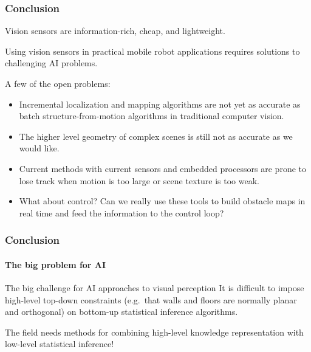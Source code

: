 \documentclass[aspectratio=169]{beamer}
\begin{document}
\begin{frame}
\frametitle{Conclusion}

Vision sensors are \alert{information-rich}, \alert{cheap}, and 
\alert{lightweight}.

\medskip

Using vision sensors in practical mobile robot applications requires
solutions to challenging AI problems.

\medskip

A few of the open problems:
\begin{itemize}
\item Incremental localization and mapping
  algorithms are not yet as accurate as
  batch structure-from-motion algorithms in traditional computer vision.
\item The higher level geometry of complex scenes is still not as
  accurate as we would like.
\item Current methods with current sensors and embedded processors are
  prone to lose track when motion is too large or scene texture is too
  weak.
\item What about control? Can we really use these tools to build
  obstacle maps in real time and feed the information to the control
  loop?
\end{itemize}

\end{frame}


\begin{frame}
\frametitle{Conclusion}
\framesubtitle{The big problem for AI}

\begin{block}{The big challenge for AI approaches to visual perception}
It is difficult to impose high-level top-down constraints (e.g.\ that
walls and floors are normally planar and orthogonal) on
bottom-up statistical inference algorithms.

\medskip

The field needs methods
for combining high-level knowledge representation
with low-level statistical inference!
\end{block}

\end{frame}
\end{document}
